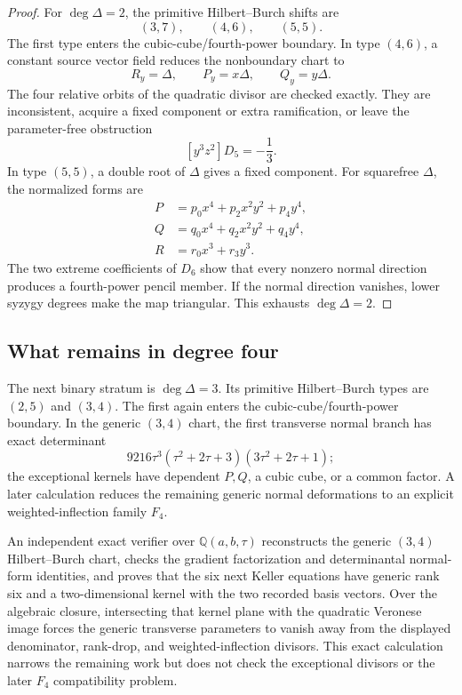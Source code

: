 \begin{proof}
For \(\deg\Delta=2\), the primitive Hilbert--Burch shifts are
\[
(3,7),\qquad(4,6),\qquad(5,5).
\]
The first type enters the cubic-cube/fourth-power boundary.  In type
\((4,6)\), a constant source vector field reduces the nonboundary chart to
\[
R_y=\Delta,\qquad P_y=x\Delta,\qquad Q_y=y\Delta.
\]
The four relative orbits of the quadratic divisor are checked exactly.
They are inconsistent, acquire a fixed component or extra ramification, or
leave the parameter-free obstruction
\[
[y^3z^2]D_5=-\frac13.
\]
In type \((5,5)\), a double root of \(\Delta\) gives a fixed component.
For squarefree \(\Delta\), the normalized forms are
\[
\begin{aligned}
P&=p_0x^4+p_2x^2y^2+p_4y^4,\\
Q&=q_0x^4+q_2x^2y^2+q_4y^4,\\
R&=r_0x^3+r_3y^3.
\end{aligned}
\]
The two extreme coefficients of \(D_6\) show that every nonzero normal
direction produces a fourth-power pencil member.  If the normal direction
vanishes, lower syzygy degrees make the map triangular.  This exhausts
\(\deg\Delta=2\).
\end{proof}

\subsection{What remains in degree four}
\label{subsec:degree-three-ramification-frontier}

The next binary stratum is \(\deg\Delta=3\).  Its primitive
Hilbert--Burch types are \((2,5)\) and \((3,4)\).  The first again enters
the cubic-cube/fourth-power boundary.  In the generic \((3,4)\) chart, the
first transverse normal branch has exact determinant
\[
9216\tau^3(\tau^2+2\tau+3)(3\tau^2+2\tau+1);
\]
the exceptional kernels have dependent \(P,Q\), a cubic cube, or a common
factor.  A later calculation reduces the remaining generic normal
deformations to an explicit weighted-inflection family \(F_4\).

An independent exact verifier over \(\mathbb Q(a,b,\tau)\) reconstructs the
generic \((3,4)\) Hilbert--Burch chart, checks the gradient factorization and
determinantal normal-form identities, and proves that the six next Keller
equations have generic rank six and a two-dimensional kernel with the two
recorded basis vectors.  Over the algebraic closure, intersecting that kernel
plane with the quadratic Veronese image forces the generic transverse
parameters to vanish away from the displayed denominator, rank-drop, and
weighted-inflection divisors.  This exact calculation narrows the remaining
work but does not check the exceptional divisors or the later \(F_4\)
compatibility problem.

